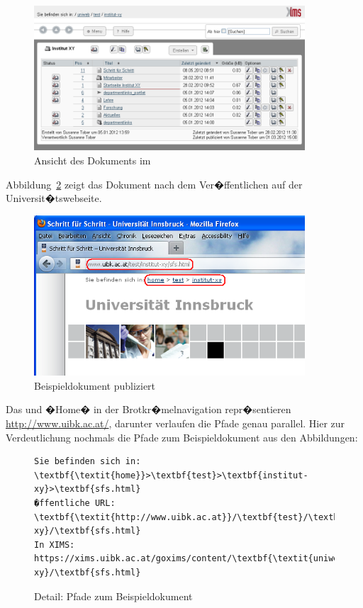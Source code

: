 \begin{figure}[H]
  \centering
  \includegraphics[width=0.9\textwidth]{./images/container-short.png}
  \caption{Ansicht des Dokuments im }
  \label{fig:dokumentinxims}
\end{figure}

Abbildung~\ref{fig:bsppubliziert} zeigt das Dokument nach dem
Ver�ffentlichen auf der Universit�tswebseite.

\begin{figure}[H]
  \centering
  \includegraphics[width=0.9\textwidth]{./images/bsp-publiziert.png}
  \caption{Beispieldokument publiziert}
  \label{fig:bsppubliziert}
\end{figure}

Das   und �Home� in der
Brotkr�melnavigation repr�sentieren \url{http://www.uibk.ac.at/},
darunter verlaufen die Pfade genau parallel. Hier zur Verdeutlichung
nochmals die Pfade zum Beispieldokument aus den Abbildungen:

\begin{figure}[H]
  \begin{Verbatim}[commandchars=\\\{\},fontsize=\footnotesize]
Sie befinden sich in:                                 \textbf{\textit{home}}>\textbf{test}>\textbf{institut-xy}>\textbf{sfs.html}
�ffentliche URL:                     \textbf{\textit{http://www.uibk.ac.at}}/\textbf{test}/\textbf{institut-xy}/\textbf{sfs.html}
In XIMS:     https://xims.uibk.ac.at/goxims/content/\textbf{\textit{uniweb}}/\textbf{test}/\textbf{institut-xy}/\textbf{sfs.html}
  \end{Verbatim}
  \caption{Detail: Pfade zum Beispieldokument}
\end{figure}

